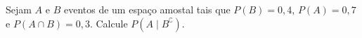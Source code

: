 %
%


\begin{exercicioBanco}[\valorquestao]
Sejam \(A\) e \(B\) eventos de um espaço amostal tais que \(P(B) = 0,4\), \(P(A) = 0,7\) e \(P(A \cap B) = 0,3\). Calcule \(P(A \mid B^{\complement})\).
\end{exercicioBanco}


